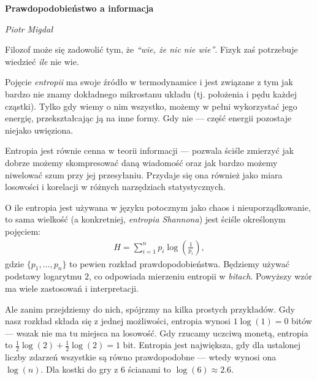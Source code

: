\documentclass[10pt,a4paper]{article}
\begin{document}
\noindent\textbf{\LARGE Prawdopodobieństwo a informacja}

\medskip
\noindent\textit{\Large Piotr Migdał}

\medskip

Filozof może się zadowolić tym, że \emph{``wie, że nic nie wie''}.
Fizyk zaś potrzebuje wiedzieć \emph{ile} nie wie.

Pojęcie \emph{entropii} ma swoje źródło w termodynamice i jest związane z tym jak bardzo nie znamy dokładnego mikrostanu układu (tj. położenia i pędu każdej cząstki).
Tylko gdy wiemy o nim wszystko, możemy w pełni wykorzystać jego energię, przekształcając ją na inne formy.
Gdy nie --- część energii pozostaje niejako uwięziona.

Entropia jest równie cenna w teorii informacji --- pozwala ściśle zmierzyć jak dobrze możemy skompresować daną wiadomość oraz jak bardzo możemy niwelować szum przy jej przesyłaniu.
Przydaje się ona również jako miara losowości i korelacji w różnych narzędziach statystycznych.

O ile entropia jest używana w języku potocznym jako chaos i nieuporządkowanie, to sama wielkość (a konkretniej, \emph{entropia Shannona}) jest ściśle określonym pojęciem:
%
%
\begin{align}
    H = \sum_{i=1}^{n} p_i \log \left(\tfrac{1}{p_i} \right),\label{eq:entropia}
\end{align}
%
%
gdzie $\{p_1, \ldots, p_n\}$ to pewien rozkład prawdopodobieństwa.
Będziemy używać podstawy logarytmu $2$, co odpowiada mierzeniu entropii w \emph{bitach}.
Powyższy wzór ma wiele zastosowań i interpretacji.

Ale zanim przejdziemy do nich, spójrzmy na kilka prostych przykładów.
Gdy nasz rozkład składa się z jednej możliwości, entropia wynosi $1 \log(1) = 0$ bitów --- wszak nie ma tu miejsca na losowość.
Gdy rzucamy uczciwą monetą, entropia to $\tfrac{1}{2} \log(2) + \tfrac{1}{2} \log(2) = 1$ bit.
Entropia jest największa, gdy dla ustalonej liczby zdarzeń wszystkie są równo prawdopodobne --- wtedy wynosi ona $\log(n)$.
Dla kostki do gry z $6$ ścianami to $\log(6)\approx 2.6$.
%
\end{document}
